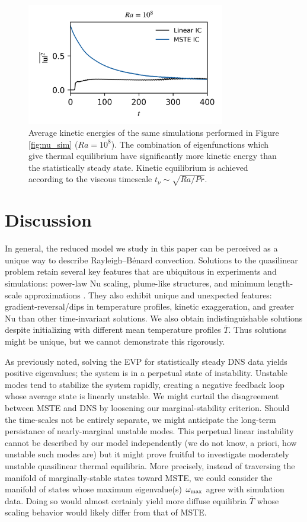 \documentclass[reprint,amsmath,amssymb,aps]{revtex4-1}
\newcommand\Nu{\mathrm{Nu}}
\begin{document}
\begin{figure}
    \begin{minipage}{3.4in}
        \centering
        \includegraphics[width=3.4in]{sim_eq_ke.png}
        \caption{Average kinetic energies of the same simulations performed in Figure \ref{fig:nu_sim} ($Ra = 10^8$). 
        The combination of eigenfunctions which give thermal equilibrium have significantly more kinetic energy than the statistically steady state. 
        Kinetic equilibrium is achieved according to the viscous timescale $t_{\nu} \sim \sqrt{Ra / Pr}$.}
        \label{fig:ke_sim}
    \end{minipage}
\end{figure}

\section{Discussion}\label{sec:Discussion}
In general, the reduced model we study in this paper can be perceived as a unique way to describe Rayleigh–Bénard convection. 
Solutions to the quasilinear problem retain several key features that are ubiquitous in experiments and simulations: power-law $\Nu$ scaling, plume-like structures, and minimum length-scale approximations \cite{Malkus_1954}. 
They also exhibit unique and unexpected features: gradient-reversal/dips in temperature profiles, kinetic exaggeration, and greater $\Nu$ than other time-invariant solutions. 
We also obtain indistinguishable solutions despite initializing with different mean temperature profiles $\bar{T}$. 
Thus solutions might be unique, but we cannot demonstrate this rigorously.

As previously noted, solving the EVP for statistically steady DNS data yields positive eigenvalues; the system is in a perpetual state of instability. 
Unstable modes tend to stabilize the system rapidly, creating a negative feedback loop whose average state is linearly unstable. 
We might curtail the disagreement between MSTE and DNS by loosening our marginal-stability criterion. 
Should the time-scales not be entirely separate, we might anticipate the long-term persistance of nearly-marginal unstable modes. 
This perpetual linear instability cannot be described by our model independently (we do not know, a priori, how unstable such modes are) but it might prove fruitful to investigate moderately unstable quasilinear thermal equilibria. 
More precisely, instead of traversing the manifold of marginally-stable states toward MSTE, we could consider the manifold of states whose maximum eigenvalue(s) $\omega_{\rm{max}}$ agree with simulation data. 
Doing so would almost certainly yield more diffuse equilibria $\bar{T}$ whose scaling behavior would likely differ from that of MSTE. 
\end{document}
